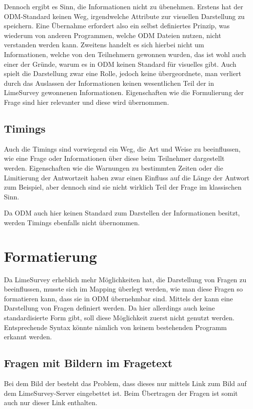 Dennoch ergibt es Sinn, die Informationen nicht zu übenehmen.
Erstens hat der ODM-Standard keinen Weg, irgendwelche Attribute zur visuellen Darstellung zu speichern.
Eine Übernahme erfordert also ein selbst definiertes Prinzip, was wiederum von anderen Programmen, welche ODM Dateien nutzen, nicht verstanden werden kann.
Zweitens handelt es sich hierbei nicht um Informationen, welche von den Teilnehmern gewonnen wurden, das ist wohl auch einer der Gründe, warum es in ODM keinen Standard für visuelles gibt.
Auch spielt die Darstellung zwar eine Rolle, jedoch keine übergeordnete, man verliert durch das Auslassen der Informationen keinen wesentlichen Teil der in LimeSurvey gewonnenen Informationen.
Eigenschaften wie die Formulierung der Frage sind hier relevanter und diese wird übernommen.

\subsection{Timings}

Auch die Timings sind vorwiegend ein Weg, die Art und Weise zu beeinflussen, wie eine Frage oder Informationen über diese beim Teilnehmer dargestellt werden.
Eigenschaften wie die Warnungen zu bestimmten Zeiten oder die Limitierung der Antwortzeit haben zwar einen Einfluss auf die Länge der Antwort zum Beispiel, aber dennoch sind sie nicht wirklich Teil der Frage im klassischen Sinn.

Da ODM auch hier keinen Standard zum Darstellen der Informationen besitzt, werden Timings ebenfalls nicht übernommen.

\section{Formatierung}

Da LimeSurvey erheblich mehr Möglichkeiten hat, die Darstellung von Fragen zu beeinflussen, musste sich im Mapping überlegt werden, wie man diese Fragen so formatieren kann, dass sie in ODM übernehmbar sind.
Mittels der  %
kann eine Darstellung von Fragen definiert werden. Da hier allerdings auch keine standardisierte Form gibt, soll diese Möglichkeit zuerst nicht genutzt werden.
Entsprechende Syntax könnte nämlich von keinem bestehenden Programm erkannt werden.

\subsection{Fragen mit Bildern im Fragetext}
Bei dem Bild der  besteht das Problem, dass dieses nur mittels Link zum Bild auf dem LimeSurvey-Server eingebettet ist.
Beim Übertragen der Fragen ist somit auch nur dieser Link enthalten.

